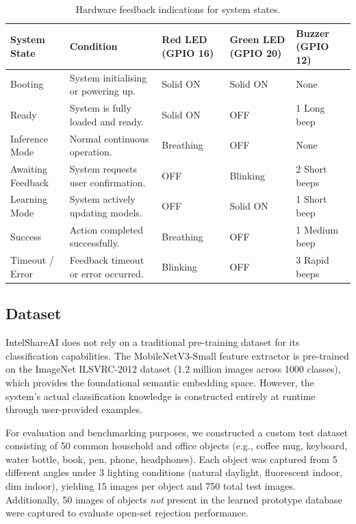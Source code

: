 \documentclass[12pt,a4paper]{report}
\begin{document}
\begin{table}[H]
    \caption{Hardware feedback indications for system states.}
    \label{tab:hardware_feedback}
    \vspace{0.5em}
    \centering
    \renewcommand{\arraystretch}{1.3}
    \small
    \begin{tabular}{|p{3cm}|p{5.5cm}|p{2cm}|p{2cm}|p{2.5cm}|}
        \hline
        \textbf{System State} & \textbf{Condition} & \textbf{Red LED (GPIO 16)} & \textbf{Green LED (GPIO 20)} & \textbf{Buzzer (GPIO 12)} \\
        \hline
        Booting & System initialising or powering up. & Solid ON & Solid ON & None \\
        \hline
        Ready & System is fully loaded and ready. & Solid ON & OFF & 1 Long beep \\
        \hline
        Inference Mode & Normal continuous operation. & Breathing & OFF & None \\
        \hline
        Awaiting Feedback & System requests user confirmation. & OFF & Blinking & 2 Short beeps \\
        \hline
        Learning Mode & System actively updating models. & OFF & Solid ON & 1 Short beep \\
        \hline
        Success & Action completed successfully. & Breathing & OFF & 1 Medium beep \\
        \hline
        Timeout / Error & Feedback timeout or error occurred. & Blinking & OFF & 3 Rapid beeps \\
        \hline
    \end{tabular}
\end{table}

\subsection{Dataset}
IntelShareAI does not rely on a traditional pre-training dataset for its classification capabilities. The MobileNetV3-Small feature extractor is pre-trained on the ImageNet ILSVRC-2012 dataset (1.2 million images across 1000 classes), which provides the foundational semantic embedding space. However, the system's actual classification knowledge is constructed entirely at runtime through user-provided examples.

For evaluation and benchmarking purposes, we constructed a custom test dataset consisting of 50 common household and office objects (e.g., coffee mug, keyboard, water bottle, book, pen, phone, headphones). Each object was captured from 5 different angles under 3 lighting conditions (natural daylight, fluorescent indoor, dim indoor), yielding 15 images per object and 750 total test images. Additionally, 50 images of objects \textit{not} present in the learned prototype database were captured to evaluate open-set rejection performance.
\end{document}
